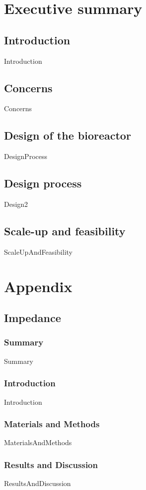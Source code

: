 \documentclass[12pt,a4paper]{report}
\begin{document}
\tableofcontents
    \chapter{Executive summary}
    \section{Introduction}
        {Introduction}
    \section{Concerns}
        {Concerns}
    \section{Design of the bioreactor}
         {DesignProcess}
    
    \section{Design process}
    {Design2}
    \section{Scale-up and feasibility}
        {ScaleUpAndFeasibility}
        
	\chapter{Appendix}
	\section{Impedance}
    \subsection{Summary}
        {Summary}
    \subsection{Introduction}
        {Introduction}
    \subsection{Materials and Methods}
        {MaterialsAndMethods}
    \subsection{Results and Discussion}
		{ResultsAndDiscussion}
\end{document}

